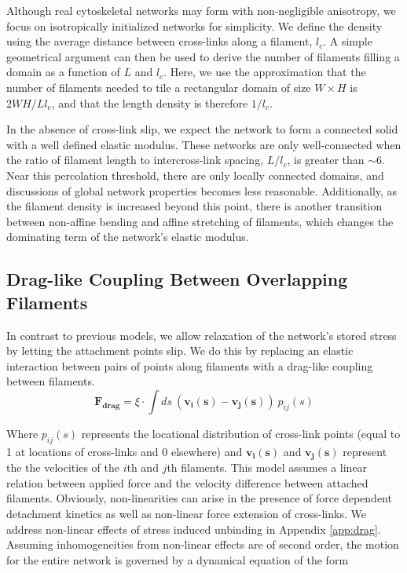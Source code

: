 \documentclass[10pt,letterpaper]{article}
\begin{document}
Although real cytoskeletal networks may form with non-negligible anisotropy,  we  focus on isotropically initialized networks for simplicity.  We define the density using the average distance between cross-links along a filament, $l_c$. A simple geometrical argument can then be used to derive the number of filaments filling a domain as a function of $L$ and $l_c$\cite{theo_hlm}.  Here, we use the approximation that the number of filaments needed to tile a rectangular domain of size $W \times H$  is $2WH/Ll_c$, and that the length density is therefore $1/l_c$. 

In the absence of cross-link slip, we expect the network to form a connected solid with a well defined elastic modulus\cite{theo_hlm,theo_hlm2}.  These networks are only well-connected when the ratio of filament length to intercross-link spacing, $L/l_c$, is greater than $\sim 6$.  Near this percolation threshold, there are only locally connected domains, and discussions of global network properties becomes less reasonable.  Additionally, as the filament density is increased beyond this point, there is another transition between non-affine bending and affine stretching of filaments, which changes the dominating term of the network's elastic modulus.



\subsection*{Drag-like Coupling Between Overlapping Filaments}
\label{exp_drag}
In contrast to previous models, we allow relaxation of the network's stored stress by letting the attachment points slip.  We do this by replacing an elastic interaction between pairs of points along filaments with a drag-like coupling between filaments.
\begin{equation}
\mathbf{F_{drag}} = \xi \cdot \int ds \: (\mathbf{v_i(s)}-\mathbf{v_j(s)}) \: p_{ij}(s)
\end{equation}

Where $p_{ij}(s)$ represents the locational distribution of cross-link points (equal to 1 at locations of cross-links and 0 elsewhere) and $\mathbf{v_i(s)}$ and $\mathbf{v_j(s)}$ represent the the velocities of the $i$th and $j$th filaments.  This model assumes a linear relation between applied force and the velocity difference between attached filaments.  Obviously, non-linearities can arise in the presence of force dependent detachment kinetics as well as non-linear force extension of cross-links. We address non-linear effects of stress induced unbinding in Appendix \ref{app:drag}.  Assuming inhomogeneities from non-linear effects are of second order, the motion for the entire network is governed by a dynamical equation of the form
\end{document}
